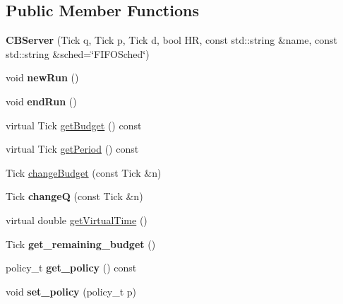 \subsection*{Public Member Functions}
\begin{DoxyCompactItemize}
\item 
{\bfseries C\+B\+Server} (Tick q, Tick p, Tick d, bool HR, const std\+::string \&name, const std\+::string \&sched=\char`\"{}F\+I\+F\+O\+Sched\char`\"{})\hypertarget{classRTSim_1_1CBServer_aca9cad430235e0e59afc100fd90ce5db}{}\label{classRTSim_1_1CBServer_aca9cad430235e0e59afc100fd90ce5db}

\item 
void {\bfseries new\+Run} ()\hypertarget{classRTSim_1_1CBServer_a8f523b3b1ffe3ffbe7bddd7451646b44}{}\label{classRTSim_1_1CBServer_a8f523b3b1ffe3ffbe7bddd7451646b44}

\item 
void {\bfseries end\+Run} ()\hypertarget{classRTSim_1_1CBServer_a5669a8b76428eb0fd12c5eadca67942f}{}\label{classRTSim_1_1CBServer_a5669a8b76428eb0fd12c5eadca67942f}

\item 
virtual Tick \hyperlink{classRTSim_1_1CBServer_a9298824b71e817063b8a54b859228def}{get\+Budget} () const 
\item 
virtual Tick \hyperlink{classRTSim_1_1CBServer_a61d1dd39522a70c89356302d5732c886}{get\+Period} () const 
\item 
Tick \hyperlink{classRTSim_1_1CBServer_a1b252e6325658cbcf672e467fc66b543}{change\+Budget} (const Tick \&n)
\item 
Tick {\bfseries changeQ} (const Tick \&n)\hypertarget{classRTSim_1_1CBServer_a71bd5ad9ba2719936b667dc0a94d8fa5}{}\label{classRTSim_1_1CBServer_a71bd5ad9ba2719936b667dc0a94d8fa5}

\item 
virtual double \hyperlink{classRTSim_1_1CBServer_a2d5572a8ead1c91b45b7d310d32d9fd6}{get\+Virtual\+Time} ()
\item 
Tick {\bfseries get\+\_\+remaining\+\_\+budget} ()\hypertarget{classRTSim_1_1CBServer_a539c676059bdde53c5a6f3ed92c8ace7}{}\label{classRTSim_1_1CBServer_a539c676059bdde53c5a6f3ed92c8ace7}

\item 
policy\+\_\+t {\bfseries get\+\_\+policy} () const \hypertarget{classRTSim_1_1CBServer_a7be1f14798824ebfea0c3b77bcac59f6}{}\label{classRTSim_1_1CBServer_a7be1f14798824ebfea0c3b77bcac59f6}

\item 
void {\bfseries set\+\_\+policy} (policy\+\_\+t p)\hypertarget{classRTSim_1_1CBServer_a18e59153bf703e07cdf4f2cbaac826a0}{}\label{classRTSim_1_1CBServer_a18e59153bf703e07cdf4f2cbaac826a0}

\end{DoxyCompactItemize}
